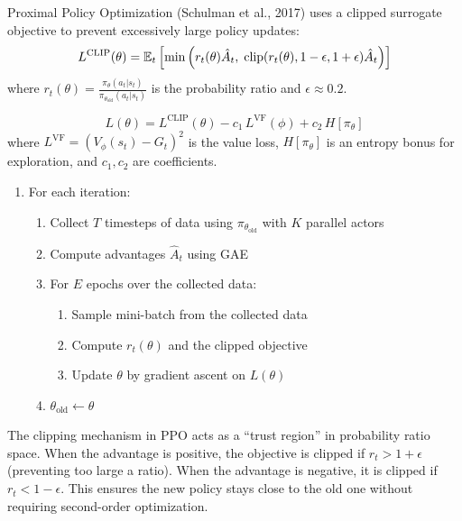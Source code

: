 \begin{definition}
Proximal Policy Optimization (Schulman et al., 2017) uses a clipped
surrogate objective to prevent excessively large policy updates:
\[
    L^{\text{CLIP}}(\theta) = \mathbb{E}_t \left[
    \min\left(r_t(\theta) \hat{A}_t, \;
    \text{clip}(r_t(\theta), 1-\epsilon, 1+\epsilon) \hat{A}_t
    \right) \right]
\]
where $r_t(\theta) = \frac{\pi_\theta(a_t|s_t)}{\pi_{\theta_{\text{old}}}(a_t|s_t)}$
is the probability ratio and $\epsilon \approx 0.2$.
\end{definition}

\begin{keyformulas}[title=\textbf{PPO Full Objective}]
\[
    L(\theta) = L^{\text{CLIP}}(\theta)
    - c_1 \, L^{\text{VF}}(\phi)
    + c_2 \, H[\pi_\theta]
\]
where $L^{\text{VF}} = (V_\phi(s_t) - G_t)^2$ is the value loss,
$H[\pi_\theta]$ is an entropy bonus for exploration, and $c_1, c_2$
are coefficients.
\end{keyformulas}

\begin{algorithme}[title=\textbf{PPO Algorithm}]
\begin{enumerate}
    \item For each iteration:
    \begin{enumerate}
        \item Collect $T$ timesteps of data using $\pi_{\theta_{\text{old}}}$
              with $K$ parallel actors
        \item Compute advantages $\hat{A}_t$ using GAE
        \item For $E$ epochs over the collected data:
        \begin{enumerate}
            \item Sample mini-batch from the collected data
            \item Compute $r_t(\theta)$ and the clipped objective
            \item Update $\theta$ by gradient ascent on $L(\theta)$
        \end{enumerate}
        \item $\theta_{\text{old}} \leftarrow \theta$
    \end{enumerate}
\end{enumerate}
\end{algorithme}

\begin{intuition}
The clipping mechanism in PPO acts as a ``trust region'' in probability
ratio space. When the advantage is positive, the objective is clipped
if $r_t > 1+\epsilon$ (preventing too large a ratio). When the advantage
is negative, it is clipped if $r_t < 1-\epsilon$. This ensures the new
policy stays close to the old one without requiring second-order
optimization.
\end{intuition}

